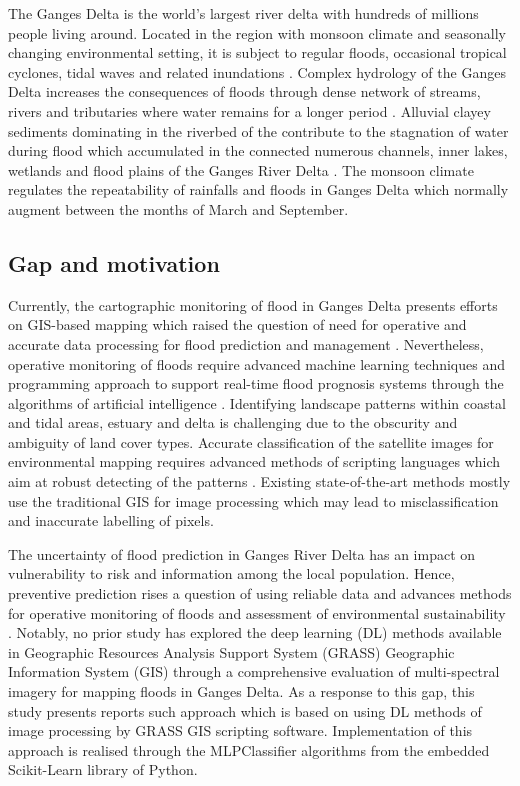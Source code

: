 \documentclass[water,article,submit,pdftex,moreauthors]{Definitions/mdpi}
\begin{document}
The Ganges Delta is the world's largest river delta with hundreds of millions people living around. Located in the region with monsoon climate and seasonally changing environmental setting, it is subject to regular floods, occasional tropical cyclones, tidal waves and related inundations \cite{Bhardwaj2022}. Complex hydrology of the Ganges Delta increases the consequences of floods through dense network of streams, rivers and tributaries where water remains for a longer period \cite{Islam}. Alluvial clayey sediments dominating in the riverbed of the contribute to the stagnation of water during flood which accumulated in the connected numerous channels, inner lakes, wetlands and flood plains of the Ganges River Delta \cite{Datta,KHAN201927,Lemenkova202029}. The monsoon climate regulates the repeatability of rainfalls and floods in Ganges Delta which normally augment between the months of March and September. 

\subsection{Gap and motivation}
Currently, the cartographic monitoring of flood in Ganges Delta presents efforts on GIS-based mapping which raised the question of need for operative and accurate data processing for flood prediction and management \cite{Sanyal2023,ISLAM2023167,RANA2023}. Nevertheless, operative monitoring of floods require advanced machine learning techniques and programming approach to support real-time flood prognosis systems through the algorithms of artificial intelligence \cite{ZHAO2021126777}. Identifying landscape patterns within coastal and tidal areas, estuary and delta is challenging due to the obscurity and ambiguity of land cover types. Accurate classification of the satellite images for environmental mapping requires advanced methods of scripting languages which aim at robust detecting of the patterns \cite{YANG2020100413,Lemenkova202322,BEVERIDGE2020104843,SADIQ2023111233,Lemenkova202227}. Existing state-of-the-art methods mostly use the traditional GIS for image processing which may lead to misclassification and inaccurate labelling of pixels. 

The uncertainty of flood prediction in Ganges River Delta has an impact on vulnerability to risk and information among the local population. Hence, preventive prediction rises a question of using reliable data and advances methods for operative monitoring of floods and assessment of environmental sustainability \cite{NICHOLLS2016370}. Notably, no prior study has explored the deep learning (DL) methods available in Geographic Resources Analysis Support System (GRASS) Geographic Information System (GIS) through a comprehensive evaluation of multi-spectral imagery for mapping floods in Ganges Delta. As a response to this gap, this study presents reports such approach which is based on using DL methods of image processing by GRASS GIS scripting software. Implementation of this approach is realised through the MLPClassifier algorithms from the embedded Scikit-Learn library of Python. 
\end{document}
